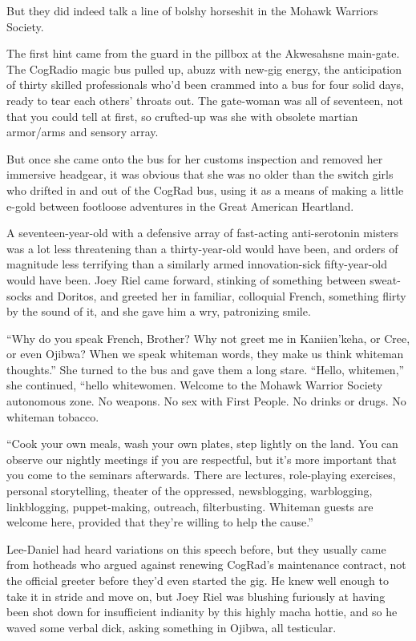 But they did indeed talk a line of bolshy horseshit in the Mohawk 
Warriors Society.

The first hint came from the guard in the pillbox at the Akwesahsne 
main-gate. The CogRadio magic bus pulled up, abuzz with new-gig energy, 
the anticipation of thirty skilled professionals who'd been crammed 
into a bus for four solid days, ready to tear each others' throats out. 
The gate-woman was all of seventeen, not that you could tell at first, 
so crufted-up was she with obsolete martian armor/arms and sensory 
array.

But once she came onto the bus for her customs inspection and removed 
her immersive headgear, it was obvious that she was no older than the 
switch girls who drifted in and out of the CogRad bus, using it as a 
means of making a little e-gold between footloose adventures in the 
Great American Heartland.

A seventeen-year-old with a defensive array of fast-acting 
anti-serotonin misters was a lot less threatening than a 
thirty-year-old would have been, and orders of magnitude less 
terrifying than a similarly armed innovation-sick fifty-year-old would 
have been. Joey Riel came forward, stinking of something between 
sweat-socks and Doritos, and greeted her in familiar, colloquial 
French, something flirty by the sound of it, and she gave him a wry, 
patronizing smile.

“Why do you speak French, Brother? Why not greet me in Kani\-ien'keha, 
or Cree, or even Ojibwa? When we speak whiteman words, they make us 
think whiteman thoughts.” She turned to the bus and gave them a long 
stare. “Hello, whitemen,” she continued, “hello whitewomen. 
Welcome to the Mohawk Warrior Society autonomous zone. No weapons. No 
sex with First People. No drinks or drugs. No whiteman tobacco.

“Cook your own meals, wash your own plates, step lightly on the land. 
You can observe our nightly meetings if you are respectful, but it's 
more important that you come to the seminars afterwards. There are 
lectures, role-playing exercises, personal storytelling, theater of the 
oppressed, newsblogging, warblogging, linkblogging, puppet-making, 
outreach, filterbusting. Whiteman guests are welcome here, provided 
that they're willing to help the cause.”

Lee-Daniel had heard variations on this speech before, but they usually 
came from hotheads who argued against renewing CogRad's maintenance 
contract, not the official greeter before they'd even started the gig. 
He knew well enough to take it in stride and move on, but Joey Riel was 
blushing furiously at having been shot down for insufficient indianity 
by this highly macha hottie, and so he waved some verbal dick, asking 
something in Ojibwa, all testicular.

